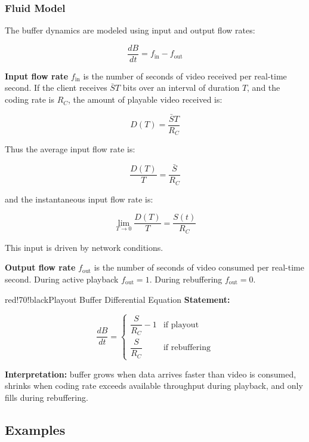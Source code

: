 \subsubsection{Fluid Model}

The buffer dynamics are modeled using input and output flow rates:

\[
\frac{dB}{dt} = f_{\text{in}} - f_{\text{out}}
\]

\textbf{Input flow rate} $f_{\text{in}}$ is the number of seconds of video received per real-time second. If the client receives $\bar{S}T$ bits over an interval of duration $T$, and the coding rate is $R_C$, the amount of playable video received is:

\[
D(T) = \frac{\bar{S}T}{R_C}
\]

Thus the average input flow rate is:

\[
\frac{D(T)}{T} = \frac{\bar{S}}{R_C}
\]

and the instantaneous input flow rate is:

\[
\lim_{T \to 0} \frac{D(T)}{T} = \frac{S(t)}{R_C}
\]

This input is driven by network conditions.

\textbf{Output flow rate} $f_{\text{out}}$ is the number of seconds of video consumed per real-time second. During active playback $f_{\text{out}} = 1$. During rebuffering $f_{\text{out}} = 0$.

\begin{calloutbox}{red!70!black}{Playout Buffer Differential Equation}
\textbf{Statement:}

\[
\frac{dB}{dt} =
\begin{cases}
\dfrac{S}{R_C} - 1 & \text{if playout} \\
\dfrac{S}{R_C} & \text{if rebuffering}
\end{cases}
\]

\textbf{Interpretation:} buffer grows when data arrives faster than video is consumed, shrinks when coding rate exceeds available throughput during playback, and only fills during rebuffering.
\end{calloutbox}

\subsection{Examples}

